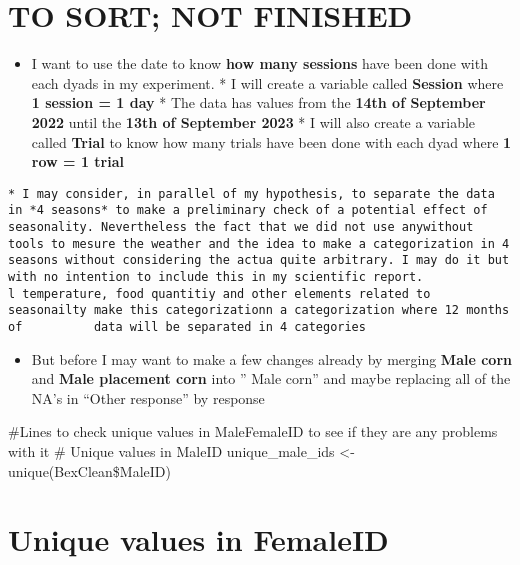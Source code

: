 \documentclass[
]{article}
\providecommand{\tightlist}{%
  \setlength{\itemsep}{0pt}\setlength{\parskip}{0pt}}
\begin{document}
\hypertarget{to-sort-not-finished}{%
\section{TO SORT; NOT FINISHED}\label{to-sort-not-finished}}

\begin{itemize}
\tightlist
\item
  I want to use the date to know \textbf{how many sessions} have been
  done with each dyads in my experiment. * I will create a variable
  called \textbf{Session} where \textbf{1 session = 1 day} * The data
  has values from the \textbf{14th of September 2022} until the
  \textbf{13th of September 2023} * I will also create a variable called
  \textbf{Trial} to know how many trials have been done with each dyad
  where \textbf{1 row = 1 trial}
\end{itemize}

\begin{verbatim}
* I may consider, in parallel of my hypothesis, to separate the data in *4 seasons* to make a preliminary check of a potential effect of seasonality. Nevertheless the fact that we did not use anywithout      tools to mesure the weather and the idea to make a categorization in 4 seasons without considering the actua quite arbitrary. I may do it but with no intention to include this in my scientific report.
l temperature, food quantitiy and other elements related to seasonailty make this categorizationn a categorization where 12 months of          data will be separated in 4 categories
\end{verbatim}

\begin{itemize}
\tightlist
\item
  But before I may want to make a few changes already by merging
  \textbf{Male corn} and \textbf{Male placement corn} into '' Male
  corn'' and maybe replacing all of the NA's in ``Other response'' by
  response
\end{itemize}

\#Lines to check unique values in MaleFemaleID to see if they are any
problems with it \# Unique values in MaleID unique\_male\_ids \textless-
unique(BexClean\$MaleID)

\hypertarget{unique-values-in-femaleid}{%
\section{Unique values in FemaleID}\label{unique-values-in-femaleid}}
\end{document}
